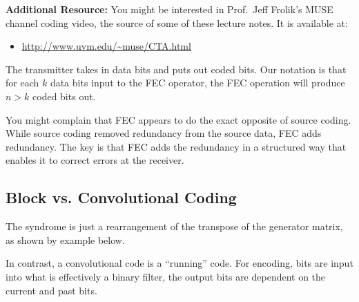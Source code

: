 {\bf Additional Resource:} You might be interested in Prof.\ Jeff Frolik's MUSE channel coding video, the source of some of these lecture notes.  It is available at:
\begin{itemize}
 \item \url{http://www.uvm.edu/~muse/CTA.html}
\end{itemize}


The transmitter takes in data bits and puts out coded bits.  Our notation is that for each $k$ data bits input to the FEC operator, the FEC operation will produce $n>k$ coded bits out.

You might complain that FEC appears to do the exact opposite of source coding.  While source coding removed redundancy from the source data, FEC adds redundancy.  The key is that FEC adds the redundancy in a structured way that enables it to correct errors at the receiver.

\subsection{Block vs. Convolutional Coding}


The syndrome is just a rearrangement of the transpose of the generator matrix, as shown by example below.

In contrast, a convolutional code is a ``running'' code.  For encoding, bits are input into what is effectively a binary filter, the output bits are dependent on the current and past bits.


